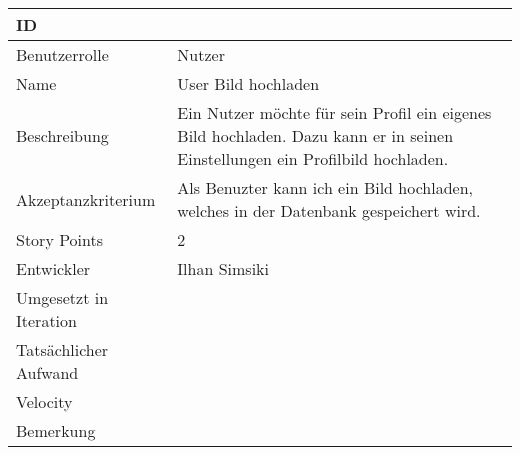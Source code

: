 \begin{tabularx}{\textwidth}{|p{}|X|}
	\hline
	ID & \\
	\hline
	Benutzerrolle & Nutzer\\
	\hline
	Name & User Bild hochladen\\
	\hline
	Beschreibung & Ein Nutzer möchte für sein Profil ein eigenes Bild hochladen. Dazu kann er in seinen Einstellungen ein Profilbild hochladen.\\
	\hline
	Akzeptanzkriterium & Als Benuzter kann ich ein Bild hochladen, welches in der Datenbank gespeichert wird.\\
	\hline
	Story Points & 2\\
	\hline
	Entwickler & Ilhan Simsiki\\
	\hline
	Umgesetzt in Iteration & \\
	\hline
	Tatsächlicher Aufwand & \\
	\hline
	Velocity & \\
	\hline
	Bemerkung & \\
	\hline
\end{tabularx}
\vspace{20pt}
